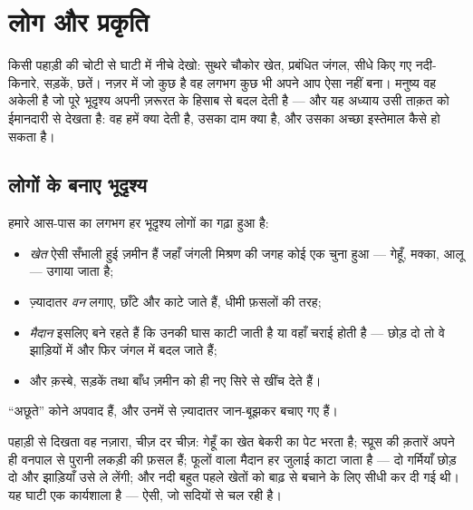 \chapter{लोग और प्रकृति}\label{ch:g5:people-and-nature}

किसी पहाड़ी की चोटी से घाटी में नीचे देखो: सुथरे चौकोर खेत, प्रबंधित
जंगल, सीधे किए गए नदी-किनारे, सड़कें, छतें। नज़र में जो कुछ है वह
लगभग कुछ भी अपने आप ऐसा नहीं बना। मनुष्य वह अकेली  है जो पूरे
भूदृश्य अपनी ज़रूरत के हिसाब से बदल देती है --- और यह अध्याय उसी ताक़त
को ईमानदारी से देखता है: वह हमें क्या देती है, उसका दाम क्या है, और
उसका अच्छा इस्तेमाल कैसे हो सकता है।

\section{लोगों के बनाए भूदृश्य}

\begin{proposition}[ज़्यादातर भूदृश्य प्रबंधित हैं]\label{prop:g5:people-and-nature:managed}
हमारे आस-पास का लगभग हर भूदृश्य लोगों का गढ़ा हुआ है:
\begin{itemize}
  \item \emph{खेत} ऐसी सँभाली हुई ज़मीन हैं जहाँ जंगली
        मिश्रण की जगह कोई एक चुना हुआ  --- गेहूँ, मक्का, आलू ---
        उगाया जाता है;
  \item ज़्यादातर \emph{वन} लगाए, छाँटे और काटे
        जाते हैं, धीमी फ़सलों की तरह;
  \item \emph{मैदान} इसलिए बने रहते हैं कि उनकी घास काटी जाती है या
        वहाँ चराई होती है --- छोड़ दो तो वे झाड़ियों में और फिर जंगल
        में बदल जाते हैं;
  \item और क़स्बे, सड़कें तथा बाँध ज़मीन को ही नए सिरे से खींच देते हैं।
\end{itemize}
``अछूते'' कोने अपवाद हैं, और उनमें से ज़्यादातर जान-बूझकर बचाए गए
हैं।
\end{proposition}
\admitted

\begin{example}[घाटी को पढ़ना]\label{ex:g5:people-and-nature:valley}
पहाड़ी से दिखता वह नज़ारा, चीज़ दर चीज़: गेहूँ का खेत बेकरी का पेट भरता
है; स्प्रूस की क़तारें अपने ही वनपाल से पुरानी लकड़ी की फ़सल हैं; फूलों
वाला मैदान हर जुलाई काटा जाता है --- दो गर्मियाँ छोड़ दो और झाड़ियाँ
उसे ले लेंगी; और नदी बहुत पहले खेतों को बाढ़ से बचाने के लिए सीधी कर
दी गई थी। यह घाटी एक कार्यशाला है --- ऐसी, जो सदियों से चल रही है।
\end{example}

